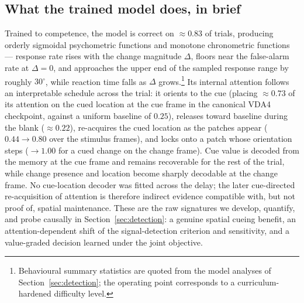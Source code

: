 \subsection{What the trained model does, in brief}
\label{sec:model-summary}

Trained to competence, the model is correct on $\approx 0.83$ of trials,
producing orderly sigmoidal psychometric functions and monotone
chronometric functions --- response rate rises with the change magnitude
$\Delta$, floors near the false-alarm rate at $\Delta = 0$, and approaches
the upper end of the sampled response range by roughly $30^\circ$, while reaction time falls as $\Delta$
grows.\footnote{Behavioural summary statistics are quoted from the model
analyses of Section~\ref{sec:detection}; the operating point corresponds to
a curriculum-hardened difficulty level.} Its internal attention follows
an interpretable schedule across the trial: it orients to the cue (placing
$\approx 0.73$ of its attention on the cued location at the cue frame in the
canonical VDA4 checkpoint,
against a uniform baseline of $0.25$), releases toward baseline during the
blank ($\approx 0.22$), re-acquires the cued location as the patches
appear ($0.44 \!\to\! 0.80$ over the stimulus frames), and locks onto a
patch whose orientation steps ($\to 1.00$ for a cued change on the change
frame). Cue value is decoded from the memory at the cue frame and remains recoverable
for the rest of the trial, while change presence and location become sharply
decodable at the change frame. No cue-location decoder was fitted across the
delay; the later cue-directed re-acquisition of attention is therefore indirect
evidence compatible with, but not proof of, spatial maintenance. These are the
raw signatures we develop, quantify,
and probe causally in Section~\ref{sec:detection}: a genuine spatial cueing
benefit, an attention-dependent shift of the signal-detection criterion
and sensitivity, and a value-graded decision learned under the joint objective.
